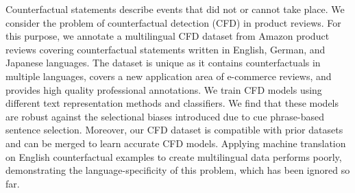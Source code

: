 Counterfactual statements describe events that did not or cannot take place. We consider the problem of counterfactual detection (CFD) in product reviews. For this purpose, we annotate a multilingual CFD dataset from Amazon product reviews covering counterfactual statements written in English, German, and Japanese languages. The dataset is unique as it contains counterfactuals in multiple languages, covers a new application area of e-commerce reviews, and provides high quality professional annotations. We train CFD models using different text representation methods and classifiers. We find that these models are robust against the selectional biases introduced due to cue phrase-based sentence selection. Moreover, our CFD dataset is compatible with prior datasets and can be merged to learn accurate CFD models. Applying machine translation on English counterfactual examples to create multilingual data performs poorly, demonstrating the language-specificity of this problem, which has been ignored so far.
